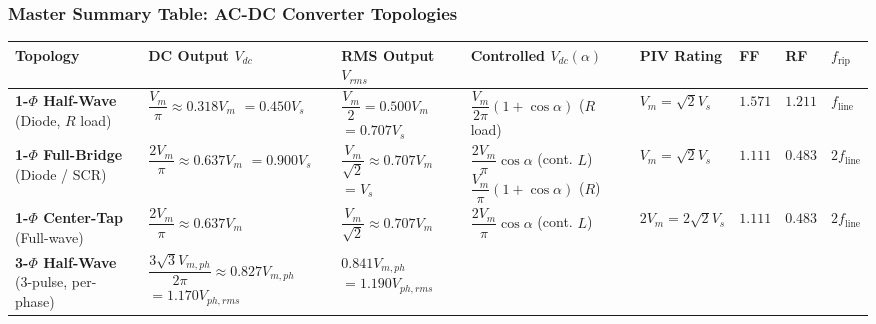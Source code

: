 \subsubsection{Master Summary Table: AC-DC Converter Topologies}
\begin{center}
\footnotesize
\renewcommand{\arraystretch}{1.20}
\begin{tabularx}{\textwidth}{@{} >{\raggedright\arraybackslash}p{2.6cm} >{\raggedright\arraybackslash}p{2.5cm} >{\raggedright\arraybackslash}p{2.1cm} >{\raggedright\arraybackslash}X >{\centering\arraybackslash}p{1.7cm} >{\centering\arraybackslash}p{0.9cm} >{\centering\arraybackslash}p{0.9cm} >{\centering\arraybackslash}p{1.1cm} @{}}
\toprule
\textbf{Topology} & \textbf{DC Output $V_{dc}$} & \textbf{RMS Output $V_{rms}$} & \textbf{Controlled $V_{dc}(\alpha)$} & \textbf{PIV Rating} & \textbf{FF} & \textbf{RF} & $f_{\mathrm{rip}}$ \\
\midrule
\textbf{1-$\Phi$ Half-Wave} \newline (Diode, $R$ load) &
$\dfrac{V_m}{\pi} \approx 0.318 V_m$ \newline $= 0.450 V_s$ &
$\dfrac{V_m}{2} = 0.500 V_m$ \newline $= 0.707 V_s$ &
$\dfrac{V_m}{2\pi}(1+\cos\alpha)$ \newline ($R$ load) &
$V_m = \sqrt{2} V_s$ &
$1.571$ &
$1.211$ &
$f_{\mathrm{line}}$ \\
\midrule
\textbf{1-$\Phi$ Full-Bridge} \newline (Diode / SCR) &
$\dfrac{2V_m}{\pi} \approx 0.637 V_m$ \newline $= 0.900 V_s$ &
$\dfrac{V_m}{\sqrt{2}} \approx 0.707 V_m$ \newline $= V_s$ &
$\dfrac{2V_m}{\pi}\cos\alpha$ (cont. $L$) \newline
$\dfrac{V_m}{\pi}(1+\cos\alpha)$ ($R$) &
$V_m = \sqrt{2} V_s$ &
$1.111$ &
$0.483$ &
$2 f_{\mathrm{line}}$ \\
\midrule
\textbf{1-$\Phi$ Center-Tap} \newline (Full-wave) &
$\dfrac{2V_m}{\pi} \approx 0.637 V_m$ &
$\dfrac{V_m}{\sqrt{2}} \approx 0.707 V_m$ &
$\dfrac{2V_m}{\pi}\cos\alpha$ (cont. $L$) &
$2V_m = 2\sqrt{2} V_s$ &
$1.111$ &
$0.483$ &
$2 f_{\mathrm{line}}$ \\
\midrule
\textbf{3-$\Phi$ Half-Wave} \newline (3-pulse, per-phase) &
$\dfrac{3\sqrt{3}V_{m,ph}}{2\pi} \approx 0.827 V_{m,ph}$ \newline $= 1.170 V_{ph,rms}$ &
$0.841 V_{m,ph}$ \newline $= 1.190 V_{ph,rms}$ &

\end{tabularx}
\end{center}
